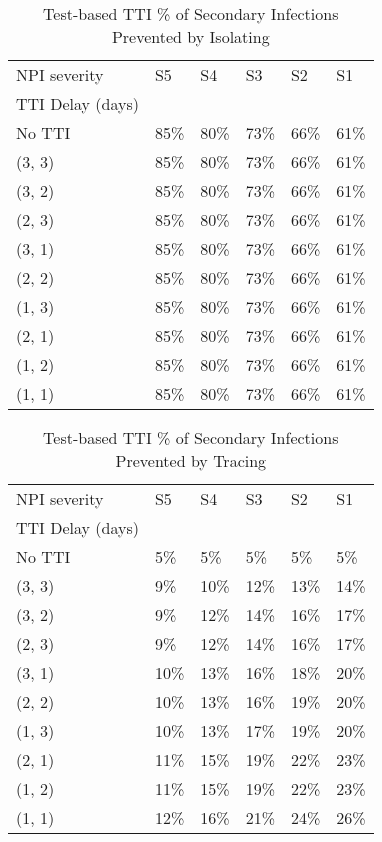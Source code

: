 \documentclass{article}
\begin{document}
    


    \begin{table}[H]
        \centering
         \begin{tabular}{llllll}
\toprule
NPI severity &    S5 &    S4 &    S3 &    S2 &    S1 \\
TTI Delay (days) &       &       &       &       &       \\
\midrule
No TTI           &  85\% &  80\% &  73\% &  66\% &  61\% \\
(3, 3)           &  85\% &  80\% &  73\% &  66\% &  61\% \\
(3, 2)           &  85\% &  80\% &  73\% &  66\% &  61\% \\
(2, 3)           &  85\% &  80\% &  73\% &  66\% &  61\% \\
(3, 1)           &  85\% &  80\% &  73\% &  66\% &  61\% \\
(2, 2)           &  85\% &  80\% &  73\% &  66\% &  61\% \\
(1, 3)           &  85\% &  80\% &  73\% &  66\% &  61\% \\
(2, 1)           &  85\% &  80\% &  73\% &  66\% &  61\% \\
(1, 2)           &  85\% &  80\% &  73\% &  66\% &  61\% \\
(1, 1)           &  85\% &  80\% &  73\% &  66\% &  61\% \\
\bottomrule
\end{tabular}

        \caption{Test-based TTI \% of Secondary Infections Prevented by Isolating}
    \end{table}
    


    \begin{table}[H]
        \centering
         \begin{tabular}{llllll}
\toprule
NPI severity &    S5 &    S4 &    S3 &    S2 &    S1 \\
TTI Delay (days) &       &       &       &       &       \\
\midrule
No TTI           &   5\% &   5\% &   5\% &   5\% &   5\% \\
(3, 3)           &   9\% &  10\% &  12\% &  13\% &  14\% \\
(3, 2)           &   9\% &  12\% &  14\% &  16\% &  17\% \\
(2, 3)           &   9\% &  12\% &  14\% &  16\% &  17\% \\
(3, 1)           &  10\% &  13\% &  16\% &  18\% &  20\% \\
(2, 2)           &  10\% &  13\% &  16\% &  19\% &  20\% \\
(1, 3)           &  10\% &  13\% &  17\% &  19\% &  20\% \\
(2, 1)           &  11\% &  15\% &  19\% &  22\% &  23\% \\
(1, 2)           &  11\% &  15\% &  19\% &  22\% &  23\% \\
(1, 1)           &  12\% &  16\% &  21\% &  24\% &  26\% \\
\bottomrule
\end{tabular}

        \caption{Test-based TTI \% of Secondary Infections Prevented by Tracing}
    \end{table}
    
\end{document}
